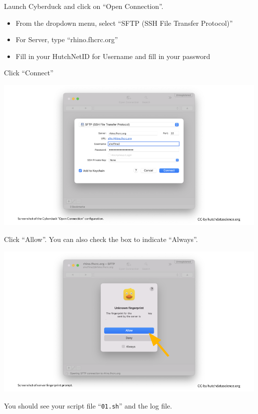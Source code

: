 \documentclass[
]{book}
\providecommand{\tightlist}{%
  \setlength{\itemsep}{0pt}\setlength{\parskip}{0pt}}
\begin{document}
Launch Cyberduck and click on ``Open Connection''.

\begin{itemize}
\tightlist
\item
  From the dropdown menu, select ``SFTP (SSH File Transfer Protocol)''
\item
  For Server, type ``rhino.fhcrc.org''
\item
  Fill in your HutchNetID for Username and fill in your password
\end{itemize}

Click ``Connect''

\includegraphics[width=1\linewidth]{resources/images/08-upload-download_files/figure-latex//1BQxrVYdKZTbpCaF-i_q9w7s9x034lEXpQZDU-Sl09cs_g1579ffd7b01_12_28}

Click ``Allow''. You can also check the box to indicate ``Always''.

\includegraphics[width=1\linewidth]{resources/images/08-upload-download_files/figure-latex//1BQxrVYdKZTbpCaF-i_q9w7s9x034lEXpQZDU-Sl09cs_g1579ffd7b01_12_33}

You should see your script file ``\texttt{01.sh}'' and the log file.
\end{document}
